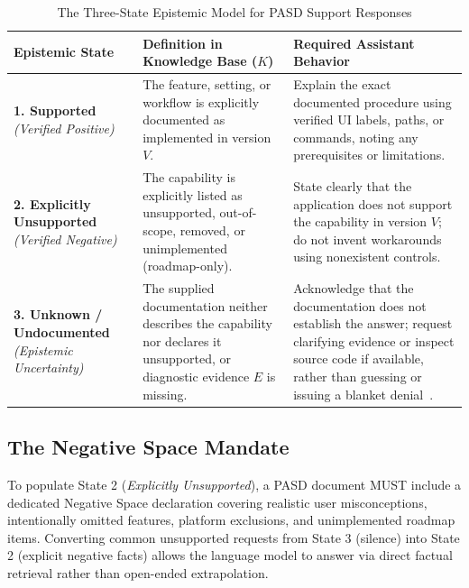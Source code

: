\documentclass[12pt, a4paper]{article}
\begin{document}
\begin{table}[htbp]
\centering
\caption{The Three-State Epistemic Model for PASD Support Responses}
\label{tab:epistemic_states}
\footnotesize
\renewcommand{\arraystretch}{1.3}
\begin{tabularx}{\textwidth}{@{}p{} p{} >{\raggedright\arraybackslash}X@{}}
\toprule
\textbf{Epistemic State} & \textbf{Definition in Knowledge Base ($K$)} & \textbf{Required Assistant Behavior} \\
\midrule
\textbf{1. Supported} \newline \textit{(Verified Positive)} & The feature, setting, or workflow is explicitly documented as implemented in version $V$. & Explain the exact documented procedure using verified UI labels, paths, or commands, noting any prerequisites or limitations. \\
\textbf{2. Explicitly Unsupported} \newline \textit{(Verified Negative)} & The capability is explicitly listed as unsupported, out-of-scope, removed, or unimplemented (roadmap-only). & State clearly that the application does not support the capability in version $V$; do not invent workarounds using nonexistent controls. \\
\textbf{3. Unknown / Undocumented} \newline \textit{(Epistemic Uncertainty)} & The supplied documentation neither describes the capability nor declares it unsupported, or diagnostic evidence $E$ is missing. & Acknowledge that the documentation does not establish the answer; request clarifying evidence or inspect source code if available, rather than guessing or issuing a blanket denial~\citep{wen2025know}. \\
\bottomrule
\end{tabularx}
\end{table}

\subsection{The Negative Space Mandate}
To populate State 2 (\textit{Explicitly Unsupported}), a PASD document MUST include a dedicated Negative Space declaration covering realistic user misconceptions, intentionally omitted features, platform exclusions, and unimplemented roadmap items. Converting common unsupported requests from State 3 (silence) into State 2 (explicit negative facts) allows the language model to answer via direct factual retrieval rather than open-ended extrapolation.
\end{document}
